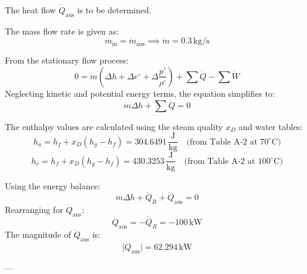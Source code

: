 The heat flow \( \dot{Q}_{\text{aus}} \) is to be determined.  

The mass flow rate is given as:  
\[
\dot{m}_{\text{in}} = \dot{m}_{\text{aus}} \implies \dot{m} = 0.3 \, \text{kg/s}
\]  

From the stationary flow process:  
\[
0 = \dot{m} \left( \Delta h + \Delta e^{\circ} + \Delta \frac{p^{\circ}}{\rho^{\circ}} \right) + \sum \dot{Q} - \sum \dot{W}
\]  
Neglecting kinetic and potential energy terms, the equation simplifies to:  
\[
\dot{m} \Delta h + \sum \dot{Q} = 0
\]  

The enthalpy values are calculated using the steam quality \( x_D \) and water tables:  
\[
h_a = h_f + x_D (h_g - h_f) = 304.6491 \, \frac{\text{J}}{\text{kg}} \quad \text{(from Table A-2 at } 70^\circ\text{C})
\]  
\[
h_e = h_f + x_D (h_g - h_f) = 430.3253 \, \frac{\text{J}}{\text{kg}} \quad \text{(from Table A-2 at } 100^\circ\text{C})
\]  

Using the energy balance:  
\[
\dot{m} \Delta h + \dot{Q}_R + \dot{Q}_{\text{aus}} = 0
\]  
Rearranging for \( \dot{Q}_{\text{aus}} \):  
\[
\dot{Q}_{\text{aus}} = -\dot{Q}_R = -100 \, \text{kW}
\]  
The magnitude of \( \dot{Q}_{\text{aus}} \) is:  
\[
\lvert \dot{Q}_{\text{aus}} \rvert = 62.294 \, \text{kW}
\]  

---